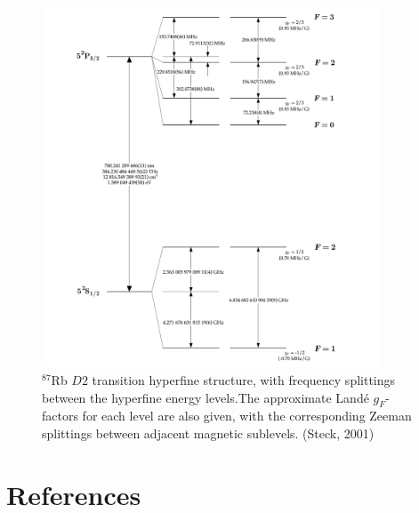 \documentclass[10pt]{article}
\begin{document}
\begin{figure}[h]
    \centering
    \includegraphics[width=0.9\textwidth]{img/rb87D2.png}
    \caption{$^87$Rb $D2$ transition hyperfine structure, with frequency splittings between the hyperfine energy levels.The approximate Landé
    $g_F$-factors for each level are also given, with the corresponding Zeeman splittings between adjacent magnetic sublevels. (Steck, 2001) }
    \label{fig:image1}
\end{figure}

\newpage
\section*{References}
\end{document}
